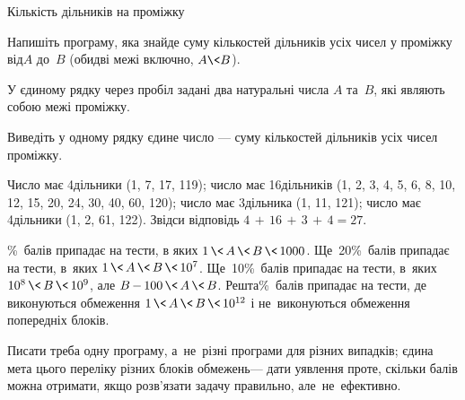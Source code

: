 \begin{problemAllDefault}{Кількість дільників на проміжку}

Напишіть програму, яка знайде суму кількостей дільників усіх чисел у проміжку від\nolinebreak[2] $A$ до~$B$ (обидві межі включно, $A\<B$).

\InputFile У єдиному рядку через пробіл задані два натуральні числа $A$ та~$B$, які являють собою межі проміжку.

\OutputFile Виведіть у одному рядку єдине число --- суму кількостей дільників усіх чисел проміжку.

\ifAfour
\vspace{-0.5\baselineskip}
\fi

\Example
\begin{exampleSimple}{5em}{3em}%
%
\end{exampleSimple}

\Note
Число має 4\nolinebreak[3] дільники (1, 7, 17, 119); 
число має 16\nolinebreak[3] дільників (1, 2, 3, 4, 5, 6, 8, 10, 12, 15, 20, 24, 30, 40, 60, 120); 
число має 3\nolinebreak[3] дільника (1, 11, 121); 
число має 4\nolinebreak[3] дільники (1, 2, 61, 122). 
Звідси відповідь \mbox{$4\,{+}\,16\,{+}\,3\,{+}\,4 = 27$}.

\%~балів припадає на тести, в яких $1\,{\<}\,A\,{\<}\,B\,{\<}\,1000$.
Ще~20\%~балів припадає на тести, в~яких $1\,{\<}\,A\,{\<}\,B\,{\<}\,10^7$.
Ще~10\%~балів припадає на тести, в~яких $10^8\,{\<}\,B\,{\<}\,10^9$, але ${B\,{-}\,100}\,{\<}\,A\,{\<}\,B$.
Решта\%~балів припадає на тести, де виконуються обмеження $1\,{\<}\,A\,{\<}\,B\,{\<}\,10^{12}$ і не~виконуються обмеження попередніх блоків.
\ifAfour\else\par\fi
Писати треба одну програму, а~не~різні програми для різних випадків; єдина мета цього переліку різних блоків обмежень\nolinebreak[3] --- дати уявлення про\nolinebreak[3] те, скільки балів можна отримати, якщо розв’язати задачу правильно, але~не~ефективно.


\end{problemAllDefault}
